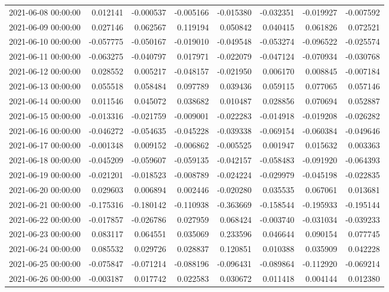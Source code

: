 \begin{tabular}{lrrrrrrr}
2021-06-08 00:00:00 & 0.012141 & -0.000537 & -0.005166 & -0.015380 & -0.032351 & -0.019927 & -0.007592 \\
2021-06-09 00:00:00 & 0.027146 & 0.062567 & 0.119194 & 0.050842 & 0.040415 & 0.061826 & 0.072521 \\
2021-06-10 00:00:00 & -0.057775 & -0.050167 & -0.019010 & -0.049548 & -0.053274 & -0.096522 & -0.025574 \\
2021-06-11 00:00:00 & -0.063275 & -0.040797 & 0.017971 & -0.022079 & -0.047124 & -0.070934 & -0.030768 \\
2021-06-12 00:00:00 & 0.028552 & 0.005217 & -0.048157 & -0.021950 & 0.006170 & 0.008845 & -0.007184 \\
2021-06-13 00:00:00 & 0.055518 & 0.058484 & 0.097789 & 0.039436 & 0.059115 & 0.077065 & 0.057146 \\
2021-06-14 00:00:00 & 0.011546 & 0.045072 & 0.038682 & 0.010487 & 0.028856 & 0.070694 & 0.052887 \\
2021-06-15 00:00:00 & -0.013316 & -0.021759 & -0.009001 & -0.022283 & -0.014918 & -0.019208 & -0.026282 \\
2021-06-16 00:00:00 & -0.046272 & -0.054635 & -0.045228 & -0.039338 & -0.069154 & -0.060384 & -0.049646 \\
2021-06-17 00:00:00 & -0.001348 & 0.009152 & -0.006862 & -0.005525 & 0.001947 & 0.015632 & 0.003363 \\
2021-06-18 00:00:00 & -0.045209 & -0.059607 & -0.059135 & -0.042157 & -0.058483 & -0.091920 & -0.064393 \\
2021-06-19 00:00:00 & -0.021201 & -0.018523 & -0.008789 & -0.024224 & -0.029979 & -0.045198 & -0.022835 \\
2021-06-20 00:00:00 & 0.029603 & 0.006894 & 0.002446 & -0.020280 & 0.035535 & 0.067061 & 0.013681 \\
2021-06-21 00:00:00 & -0.175316 & -0.180142 & -0.110938 & -0.363669 & -0.158544 & -0.195933 & -0.195144 \\
2021-06-22 00:00:00 & -0.017857 & -0.026786 & 0.027959 & 0.068424 & -0.003740 & -0.031034 & -0.039233 \\
2021-06-23 00:00:00 & 0.083117 & 0.064551 & 0.035069 & 0.233596 & 0.046644 & 0.090154 & 0.077745 \\
2021-06-24 00:00:00 & 0.085532 & 0.029726 & 0.028837 & 0.120851 & 0.010388 & 0.035909 & 0.042228 \\
2021-06-25 00:00:00 & -0.075847 & -0.071214 & -0.088196 & -0.096431 & -0.089864 & -0.112920 & -0.069214 \\
2021-06-26 00:00:00 & -0.003187 & 0.017742 & 0.022583 & 0.030672 & 0.011418 & 0.004144 & 0.012380 \\

\end{tabular}

